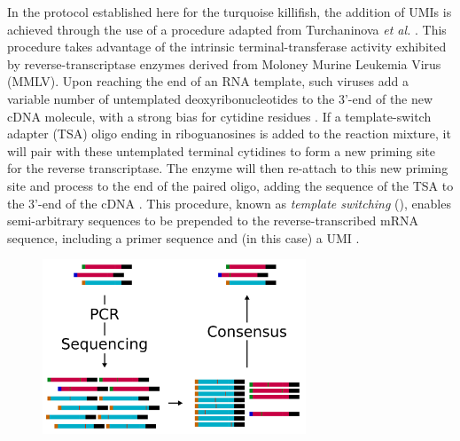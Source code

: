 In the \igseq protocol established here for the turquoise killifish, the addition of UMIs is achieved through the use of a procedure adapted from Turchaninova \textit{et al.} \parencite{turchaninova2016igprep}. This procedure takes advantage of the intrinsic terminal-transferase activity exhibited by reverse-transcriptase enzymes derived from Moloney Murine Leukemia Virus (MMLV). Upon reaching the end of an RNA template, such viruses add a variable number of untemplated deoxyribonucleotides to the 3'-end of the new cDNA molecule, with a strong bias for cytidine residues \parencite{zajac2013switching}. If a template-switch adapter (TSA) oligo ending in riboguanosines is added to the reaction mixture, it will pair with these untemplated terminal cytidines to form a new priming site for the reverse transcriptase. The enzyme will then re-attach to this new priming site and process to the end of the paired oligo, adding the sequence of the TSA to the 3'-end of the cDNA \parencite{zajac2013switching}. This procedure, known as \textit{template switching} (), enables semi-arbitrary sequences to be prepended to the reverse-transcribed mRNA sequence, including a primer sequence and (in this case) a UMI \parencite{turchaninova2016igprep}.

\begin{figure}
\centering
\includegraphics[width=0.7\textwidth]{_Figures/png_edited/umi-consensus-schema}
\label{fig:umi-consensus-schema}
\end{figure}

